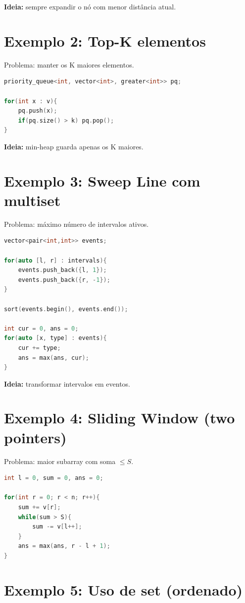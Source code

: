 \documentclass[11pt]{article}
\begin{document}
\textbf{Ideia:} sempre expandir o nó com menor distância atual.

\section{Exemplo 2: Top-K elementos}

Problema: manter os K maiores elementos.

\begin{lstlisting}[language=C++]
priority_queue<int, vector<int>, greater<int>> pq;

for(int x : v){
    pq.push(x);
    if(pq.size() > k) pq.pop();
}
\end{lstlisting}

\textbf{Ideia:} min-heap guarda apenas os K maiores.

\section{Exemplo 3: Sweep Line com multiset}

Problema: máximo número de intervalos ativos.

\begin{lstlisting}[language=C++]
vector<pair<int,int>> events;

for(auto [l, r] : intervals){
    events.push_back({l, 1});
    events.push_back({r, -1});
}

sort(events.begin(), events.end());

int cur = 0, ans = 0;
for(auto [x, type] : events){
    cur += type;
    ans = max(ans, cur);
}
\end{lstlisting}

\textbf{Ideia:} transformar intervalos em eventos.

\section{Exemplo 4: Sliding Window (two pointers)}

Problema: maior subarray com soma $\leq S$.

\begin{lstlisting}[language=C++]
int l = 0, sum = 0, ans = 0;

for(int r = 0; r < n; r++){
    sum += v[r];
    while(sum > S){
        sum -= v[l++];
    }
    ans = max(ans, r - l + 1);
}
\end{lstlisting}

\section{Exemplo 5: Uso de set (ordenado)}
\end{document}
